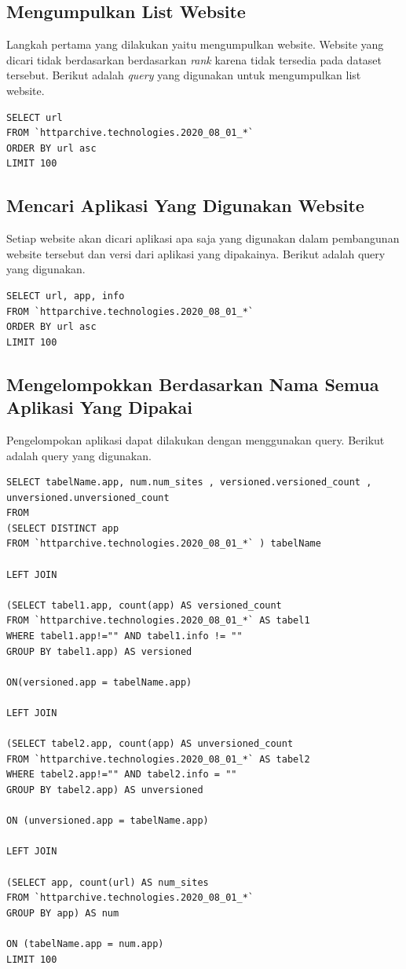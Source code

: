 \subsection{Mengumpulkan List Website}
Langkah pertama yang dilakukan yaitu mengumpulkan website. Website yang dicari tidak berdasarkan berdasarkan \textit{rank} karena tidak tersedia pada dataset tersebut. Berikut adalah \textit{query} yang digunakan untuk mengumpulkan list website.
\begin{verbatim}
SELECT url
FROM `httparchive.technologies.2020_08_01_*`
ORDER BY url asc
LIMIT 100
\end{verbatim}

\subsection{Mencari Aplikasi Yang Digunakan Website}
Setiap website akan dicari aplikasi apa saja yang digunakan dalam pembangunan website tersebut dan versi dari aplikasi yang dipakainya. Berikut adalah query yang digunakan.
\begin{verbatim}
SELECT url, app, info
FROM `httparchive.technologies.2020_08_01_*`
ORDER BY url asc
LIMIT 100
\end{verbatim}

\subsection{Mengelompokkan Berdasarkan Nama Semua Aplikasi Yang Dipakai}
Pengelompokan aplikasi dapat dilakukan dengan menggunakan query. Berikut adalah query yang digunakan.
\begin{verbatim}
SELECT tabelName.app, num.num_sites , versioned.versioned_count , unversioned.unversioned_count
FROM 
(SELECT DISTINCT app
FROM `httparchive.technologies.2020_08_01_*` ) tabelName

LEFT JOIN 

(SELECT tabel1.app, count(app) AS versioned_count
FROM `httparchive.technologies.2020_08_01_*` AS tabel1
WHERE tabel1.app!="" AND tabel1.info != "" 
GROUP BY tabel1.app) AS versioned

ON(versioned.app = tabelName.app)

LEFT JOIN

(SELECT tabel2.app, count(app) AS unversioned_count
FROM `httparchive.technologies.2020_08_01_*` AS tabel2
WHERE tabel2.app!="" AND tabel2.info = "" 
GROUP BY tabel2.app) AS unversioned

ON (unversioned.app = tabelName.app)

LEFT JOIN 

(SELECT app, count(url) AS num_sites
FROM `httparchive.technologies.2020_08_01_*`
GROUP BY app) AS num

ON (tabelName.app = num.app)
LIMIT 100
\end{verbatim}

